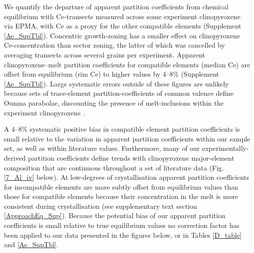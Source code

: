 \documentclass[review,authoryear,12pt]{elsarticle}
\begin{document}
	We quantify the departure of apparent partition coefficients from chemical equilibrium with Ce-transects measured across some experiment clinopyroxene via EPMA, with Ce as a proxy for the other compatible elements (Supplement \ref{Ae_SupTbl}). Concentric growth-zoning has a smaller effect on clinopyroxene Ce-concentration than sector zoning, the latter of which was cancelled by averaging transects across several grains per experiment.
		Apparent clinopyroxene--melt partition coefficients for compatible elements (median Ce) are offset from equilibrium (rim Ce) to higher values by 4--8\% (Supplement \ref{Ae_SupTbl}). Large systematic errors outside of these figures are unlikely because sets of trace-element partition-coefficients of common valence define Ounma parabolae, discounting the presence of melt-inclusions within the experiment clinopyroxene \citep[see Fig. \ref{8_Latticestrain3} below and][]{Kennedy1993}.

A 4--8\% systematic positive bias in compatible element partition coefficients is small relative to the variation in apparent partition coefficients within our sample set, as well as within literature values. Furthermore, many of our experimentally-derived partition coefficients define trends with clinopyroxene major-element composition that are continuous throughout a set of literature data (Fig. \ref{7_Al_iv} below). At low-degrees of crystallisation apparent partition coefficients for incompatible elements are more subtly offset from equilibrium values than those for compatible elements because their concentration in the melt is more consistent during crystallisation (see supplementary text section \ref{ApproachEq_Sup}). 
Because the potential bias of our apparent partition coefficients is small relative to true equilibrium values no correction factor has been applied to our data presented in the figures below, or in Tables \ref{D_table} and \ref{Ae_SupTbl}.

\end{document}
